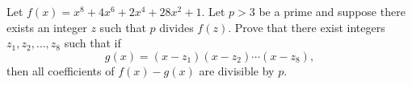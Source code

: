 Let $f(x) = x^8 + 4x^6 + 2x^4 + 28x^2 + 1$. Let $p > 3$ be a prime and suppose there exists an integer $z$ such that $p$ divides $f(z)$. Prove that there exist integers $z_1, z_2, \ldots, z_8$ such that if
\[ g(x) = (x-z_1)(x-z_2)\cdots(x-z_8), \]
then all coefficients of $f(x) - g(x)$ are divisible by $p$.
